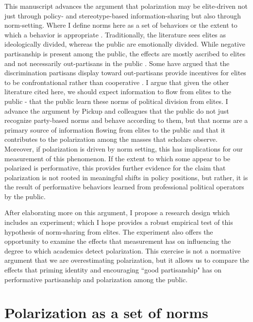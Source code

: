\documentclass [12pt]{article}
\begin{document}
This manuscript advances the argument that polarization may be elite-driven not just through policy- and stereotype-based information-sharing but also through norm-setting. Where I define norms here as a set of behaviors or the extent to which a behavior is appropriate \citep{pickup_et-al_2020}. Traditionally, the literature sees elites as ideologically divided, whereas the public are emotionally divided. While negative partisanship is present among the public, the effects are mostly ascribed to elites and not necessarily out-partisans in the public \citep{druckman_levendusky_2019}. Some have argued that the discrimination partisans display toward out-partisans provide incentives for elites to be confrontational rather than cooperative \citep{iyengar_westwood_2015}. I argue that given the other literature cited here, we should expect information to flow from elites to the public - that the public learn these norms of political division from elites. I advance the argument by Pickup and colleagues \citep{pickup_et-al_2020} that the public do not just recognize party-based norms and behave according to them, but that norms are a primary source of information flowing from elites to the public and that it contributes to the polarization among the masses that scholars observe. Moreover, if polarization is driven by norm setting, this has implications for our measurement of this phenomenon. If the extent to which some appear to be polarized is performative, this provides further evidence for the claim that polarization is not rooted in meaningful shifts in policy positions, but rather, it is the result of performative behaviors learned from professional political operators by the public.

After elaborating more on this argument, I propose a research design which includes an experiment; which I hope provides a robust empirical test of this hypothesis of norm-sharing from elites. The experiment also offers the opportunity to examine the effects that measurement has on influencing the degree to which academics detect polarization. This exercise is not a normative argument that we are overestimating polarization, but it allows us to compare the effects that priming identity and encouraging ``good partisanship" has on performative partisanship and polarization among the public.

\section{Polarization as a set of norms}
\end{document}
